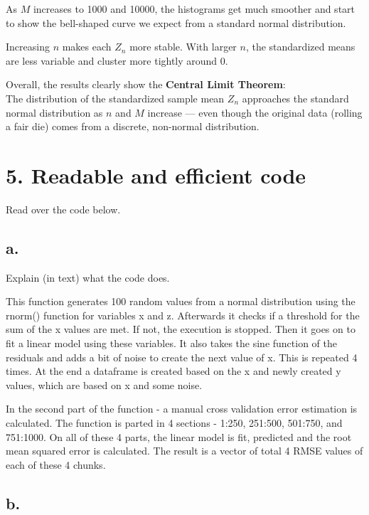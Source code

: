 \documentclass[
]{article}
\begin{document}
As \(M\) increases to 1000 and 10000, the histograms get much smoother
and start to show the bell-shaped curve we expect from a standard normal
distribution.

Increasing \(n\) makes each \(Z_n\) more stable. With larger \(n\), the
standardized means are less variable and cluster more tightly around 0.

Overall, the results clearly show the \textbf{Central Limit Theorem}:\\
The distribution of the standardized sample mean \(Z_n\) approaches the
standard normal distribution as \(n\) and \(M\) increase --- even though
the original data (rolling a fair die) comes from a discrete, non-normal
distribution.

\section{5. Readable and efficient
code}\label{readable-and-efficient-code}

Read over the code below.

\subsection{a.}\label{a.-4}

Explain (in text) what the code does.

This function generates 100 random values from a normal distribution
using the rnorm() function for variables x and z. Afterwards it checks
if a threshold for the sum of the x values are met. If not, the
execution is stopped. Then it goes on to fit a linear model using these
variables. It also takes the sine function of the residuals and adds a
bit of noise to create the next value of x. This is repeated 4 times. At
the end a dataframe is created based on the x and newly created y
values, which are based on x and some noise.

In the second part of the function - a manual cross validation error
estimation is calculated. The function is parted in 4 sections - 1:250,
251:500, 501:750, and 751:1000. On all of these 4 parts, the linear
model is fit, predicted and the root mean squared error is calculated.
The result is a vector of total 4 RMSE values of each of these 4 chunks.

\subsection{b.}\label{b.-4}
\end{document}

